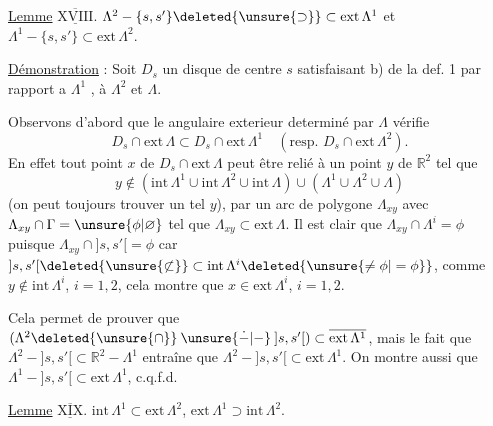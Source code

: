 \uline{Lemme} $\underline{\overline{\mathrm{XVIII}}}$. $\Lambda^{2}-\{s,s'\}\deleted{\unsure{\supset}}\subset\mathrm{ext}\,\Lambda^{1}$ et $\Lambda^{1}-\{s,s'\}\subset\mathrm{ext}\,\Lambda^{2}$.

\uline{Démonstration} : Soit $D_s$ un disque de centre $s$ satisfaisant b) de la def. 1 par rapport a $\Lambda^{1}$ , à $\Lambda^{2}$ et  $\Lambda$.

Observons d'abord que le  angulaire exterieur  determiné par $\Lambda$ vérifie
\[
D_s\cap\mathrm{ext}\,\Lambda\subset D_s\cap\mathrm{ext}\,\Lambda^{1}\quad(\text{resp. }D_s\cap\mathrm{ext}\,\Lambda^{2}).
\]
En effet tout point $x$ de $D_s\cap\mathrm{ext}\,\Lambda$ peut être relié à un point $y$ de $\mathbb{R}^{2}$ tel que
\[
y\notin(\mathrm{int}\,\Lambda^{1}\cup\mathrm{int}\,\Lambda^{2}\cup\mathrm{int}\,\Lambda)\cup(\Lambda^{1}\cup\Lambda^{2}\cup\Lambda)
\]
 (on peut toujours trouver un tel $y$), par un arc de polygone $\Lambda_{xy}$ avec $\Lambda_{xy}\cap\Gamma=\unsure{\phi|\varnothing}$  tel que $\Lambda_{xy}\subset\mathrm{ext}\,\Lambda$. Il est clair que $\Lambda_{xy}\cap\Lambda^{i}=\phi$ puisque $\Lambda_{xy}\cap{]s,s'[}=\phi$ car $ {]s,s'[}\deleted{\unsure{\not\subset}}\subset\mathrm{int}\,\Lambda^{i}\deleted{\unsure{\ne\phi|=\phi}}$, comme $y\notin\mathrm{int}\,\Lambda^{i}$, $i=1,2$, cela montre que $x\in\mathrm{ext}\,\Lambda^{i}$, $i=1,2$.

Cela permet de prouver que $(\Lambda^{2}\deleted{\unsure{\cap}}\mathbin{\unsure{\dot{-}|-}}{]s,s'[})\subset\overline{\mathrm{ext}\,\Lambda^{1}}$, mais le fait que $\Lambda^{2}-{]s,s'[}\subset\mathbb{R}^{2}-\Lambda^{1}$ entraîne que $\Lambda^{2}-{]s,s'[}\subset\mathrm{ext}\,\Lambda^{1}$. On montre aussi  que $\Lambda^{1}-{]s,s'[}\subset\mathrm{ext}\,\Lambda^{1}$, c.q.f.d.

\uline{Lemme} $\underline{\overline{\mathrm{XIX}}}$. $\mathrm{int}\,\Lambda^{1}\subset\mathrm{ext}\,\Lambda^{2}$, $\mathrm{ext}\,\Lambda^{1}\supset\mathrm{int}\,\Lambda^{2}$.

